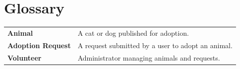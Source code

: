 \section{Glossary}

\begin{longtable}{p{4cm} p{10cm}}
\textbf{Animal} & A cat or dog published for adoption. \\
\textbf{Adoption Request} & A request submitted by a user to adopt an animal. \\
\textbf{Volunteer} & Administrator managing animals and requests. \\
\end{longtable}
